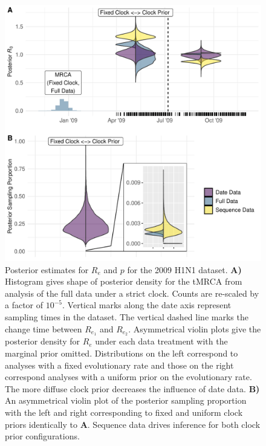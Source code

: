 \documentclass{article}
\begin{document}
\begin{figure}[H]
\centering
\includegraphics[width=1\linewidth]{../figures/h1n1Posts.pdf}
\caption{Posterior estimates for $R_e$ and $p$ for the 2009 H1N1 dataset. \textbf{A)} Histogram gives shape of posterior density for the tMRCA from analysis of the full data under a strict clock. Counts are re-scaled by a factor of $10^{-5}$. Vertical marks along the date axis represent sampling times in the dataset. The vertical dashed line marks the change time between $R_{e_1}$ and $R_{e_2}$. Asymmetrical violin plots give the posterior density for $R_e$ under each data treatment with the marginal prior omitted. Distributions on the left correspond to analyses with a fixed evolutionary rate and those on the right correspond analyses with a uniform prior on the evolutionary rate. The more diffuse clock prior decreases the influence of date data. \textbf{B)} An asymmetrical violin plot of the posterior sampling proportion with the left and right corresponding to fixed and uniform clock priors identically to \textbf{A}. Sequence data drives inference for both clock prior configurations.}
\label{fig:h1n1Fig}
\end{figure}

\end{document}
